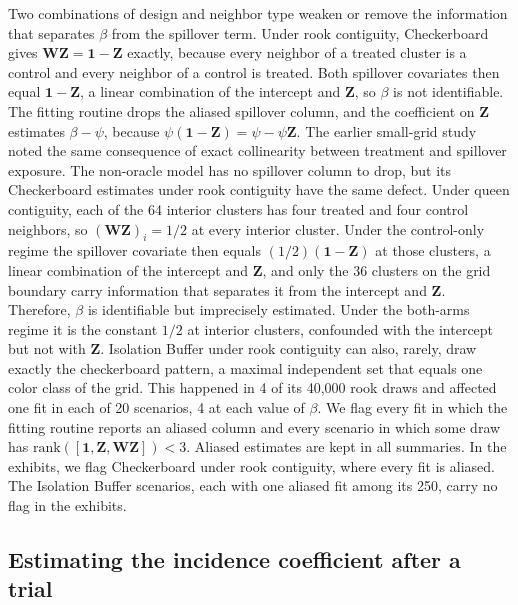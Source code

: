 \documentclass[11pt]{article}
\begin{document}
Two combinations of design and neighbor type weaken or remove the
information that separates \(\beta\) from the spillover term. Under rook
contiguity, Checkerboard gives \(\mathbf{W}\mathbf{Z} = \mathbf{1} - \mathbf{Z}\) exactly, because every
neighbor of a treated cluster is a control and every neighbor of a
control is treated. Both spillover covariates then equal
\(\mathbf{1} - \mathbf{Z}\), a linear combination of the intercept and \(\mathbf{Z}\), so
\(\beta\) is not identifiable. The fitting routine drops the aliased
spillover column, and the coefficient on \(\mathbf{Z}\) estimates
$\beta - \psi$, because $\psi(\mathbf{1} - \mathbf{Z}) = \psi - \psi\mathbf{Z}$. The earlier small-grid study noted the same
consequence of exact collinearity between treatment and spillover
exposure. The non-oracle model has no spillover column to drop, but its Checkerboard
estimates under rook contiguity have the same defect. Under queen
contiguity, each of the 64 interior clusters has four treated and four
control neighbors, so \((\mathbf{W}\mathbf{Z})_i = 1/2\) at every interior cluster. Under the
control-only regime the spillover covariate then equals
\((1/2)(\mathbf{1} - \mathbf{Z})\) at those clusters, a linear combination of the
intercept and \(\mathbf{Z}\), and only the 36 clusters on the grid boundary carry
information that separates it from the intercept and \(\mathbf{Z}\).
Therefore, \(\beta\) is identifiable but imprecisely estimated. Under the both-arms regime it is the
constant \(1/2\) at interior clusters, confounded with the
intercept but not with \(\mathbf{Z}\). Isolation Buffer under rook contiguity can
also, rarely, draw exactly the checkerboard pattern, a maximal
independent set that equals one color class of the grid. This happened
in 4 of its 40,000 rook draws and affected one fit in each of 20
scenarios, 4 at each value of \(\beta\). We flag every fit in which the
fitting routine reports an aliased column and every scenario in which
some draw has \(\text{rank}([\mathbf{1}, \mathbf{Z}, \mathbf{W}\mathbf{Z}]) < 3\). Aliased estimates are
kept in all summaries. In the exhibits, we flag Checkerboard under rook
contiguity, where every fit is aliased. The Isolation Buffer scenarios,
each with one aliased fit among its 250, carry no flag in the exhibits.

\subsection{Estimating the incidence coefficient after a trial}\label{incidence-coefficient}
\end{document}
